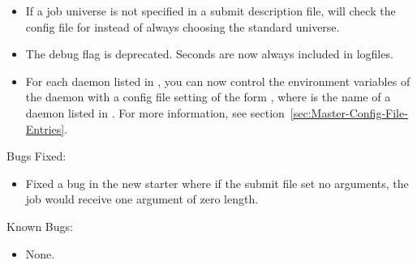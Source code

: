 \begin{itemize}

\item If a job universe is not specified in a submit description file, 
  will check the config file for 
instead of always choosing the standard universe. 

\item The  debug flag is deprecated. Seconds are now always
included in logfiles. 

\item For each daemon listed in , you can now control the
environment variables of the daemon with a config file setting of the form
, where  is the name of a
daemon listed in . For more information, see
section~\ref{sec:Master-Config-File-Entries}.

\end{itemize}

\noindent Bugs Fixed:

\begin{itemize}

\item Fixed a bug in the new starter where if the submit file set no
arguments, the job would receive one argument of zero length.

\end{itemize}

\noindent Known Bugs:

\begin{itemize}

\item None.

\end{itemize}


